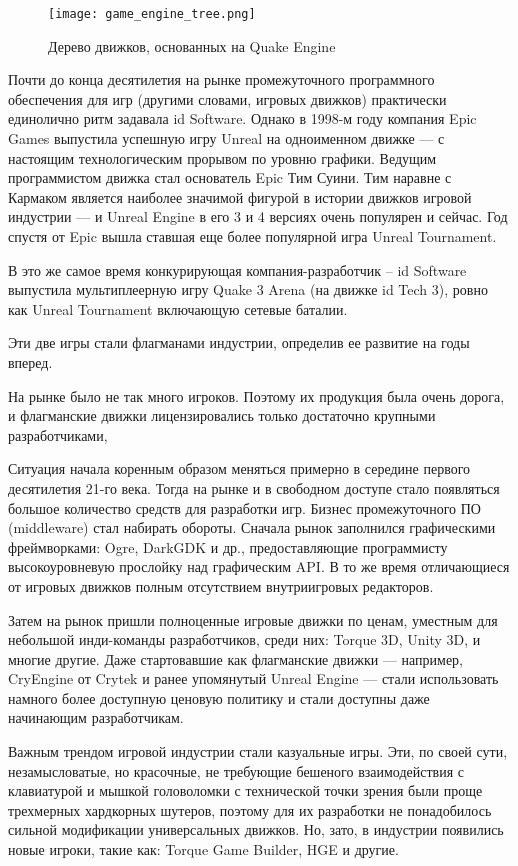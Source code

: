 \begin{figure}[p]
	\noindent\centering
	\texttt{[image: game\_engine\_tree.png]}  
	\caption{ Дерево движков, основанных на Quake Engine }
	\label{fig:domain:game_engint_hist:quake_tree}
\end{figure}

Почти до конца десятилетия на рынке промежуточного программного обеспечения для игр (другими словами, игровых движков) практически единолично ритм задавала id Software. Однако в 1998-м году компания Epic Games выпустила успешную игру Unreal на одноименном движке — с настоящим технологическим прорывом по уровню графики. Ведущим программистом движка стал основатель Epic Тим Суини. Тим наравне с Кармаком является наиболее значимой фигурой в истории движков игровой индустрии — и Unreal Engine в его 3 и 4 версиях очень популярен и сейчас. Год спустя от Epic вышла ставшая еще более популярной игра Unreal Tournament.

В это же самое время конкурирующая компания-разработчик – id Software выпустила мультиплеерную игру Quake 3 Arena (на движке id Tech 3), ровно как Unreal Tournament включающую сетевые баталии.

Эти две игры стали флагманами индустрии, определив ее развитие на годы вперед.

На рынке было не так много игроков. Поэтому их продукция была очень дорога, и флагманские движки лицензировались только достаточно крупными разработчиками,

Ситуация начала коренным образом меняться примерно в середине первого десятилетия 21-го века. Тогда на рынке и в свободном доступе стало появляться большое количество средств для разработки игр. Бизнес промежуточного ПО (middleware) стал набирать обороты. Сначала рынок заполнился графическими фреймворками: Ogre, DarkGDK и др., предоставляющие программисту высокоуровневую прослойку над графическим API. В то же время отличающиеся от игровых движков полным отсутствием внутриигровых редакторов.

Затем на рынок пришли полноценные игровые движки по ценам, уместным для небольшой инди-команды разработчиков, среди них: Torque 3D, Unity 3D, и многие другие. Даже стартовавшие как флагманские движки — например, CryEngine от Crytek и ранее упомянутый Unreal Engine — стали использовать намного более доступную ценовую политику и стали доступны даже начинающим разработчикам.

Важным трендом игровой индустрии стали казуальные игры. Эти, по своей сути, незамысловатые, но красочные, не требующие бешеного взаимодействия с клавиатурой и мышкой головоломки с технической точки зрения были проще трехмерных хардкорных шутеров, поэтому для их разработки не понадобилось сильной модификации универсальных движков. Но, зато, в индустрии появились новые игроки, такие как: Torque Game Builder, HGE и другие.

